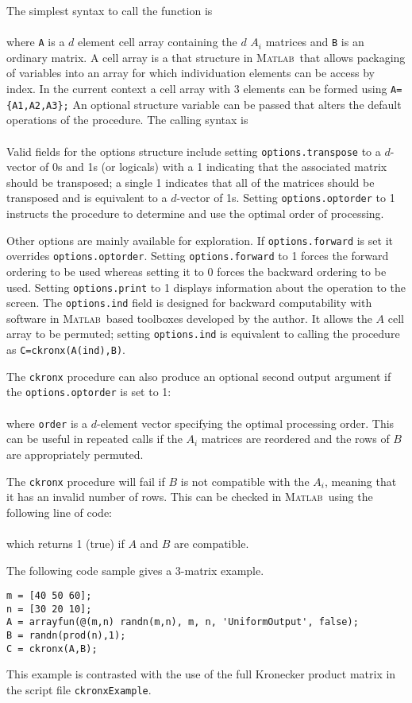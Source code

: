\documentclass[12pt,fleqn]{article}
\def\matlab{\textsc{Matlab}}   %
\begin{document}
The simplest syntax to call the function is\\
\hspace*{1in}{\tt C=ckronx(A,B)}\\
where {\tt A} is a $d$ element cell array containing the $d$ $A_i$ matrices and {\tt B} is an ordinary matrix. A cell array is a that structure in \matlab~that allows packaging of variables into an array for which individuation elements can be access by index. In the current context a cell array with 3 elements can be formed using {\tt A=\{A1,A2,A3\};} An optional structure variable can be passed that alters the default operations of the procedure. The calling syntax is\\
\hspace*{1in}{\tt C=ckronx(A,B,options)}\\
Valid fields for the options structure include setting {\tt options.transpose} to a $d$-vector of 0s and 1s (or logicals) with a 1 indicating that the associated matrix should be transposed; a single 1 indicates that all of the matrices should be transposed and is equivalent to a $d$-vector of 1s. Setting {\tt options.optorder} to 1 instructs the procedure to determine and use the optimal order of processing.

Other options are mainly available for exploration. If {\tt options.forward} is set it overrides {\tt options.optorder}. Setting {\tt options.forward} to 1 forces the forward ordering to be used whereas setting it to 0 forces the backward ordering to be used. Setting {\tt options.print} to 1 displays information about the operation to the screen. The {\tt options.ind} field is designed for backward computability with software in \matlab~based toolboxes developed by the author. It allows the $A$ cell array to be permuted; setting {\tt options.ind} is equivalent to calling the procedure as {\tt C=ckronx(A(ind),B)}.

The {\tt ckronx} procedure can also produce an optional second output argument if the {\tt options.optorder} is set to 1:\\
\hspace*{1in}{\tt[C,order]=ckronx(A,B,options)}\\
where {\tt order} is a $d$-element vector specifying the optimal processing order. This can be useful in repeated calls if the $A_i$ matrices are reordered and the rows of $B$ are appropriately permuted.

The {\tt ckronx} procedure will fail if $B$ is not compatible with the $A_i$, meaning that it has an invalid number of rows. This can be checked in \matlab~using the following line of code:\\
\hspace*{0.5in}{\tt size(B,1) == prod( cellfun( @(x) size(x,2), A ) )}\\
which returns 1 (true) if $A$ and $B$ are compatible.

The following code sample gives a 3-matrix example.
\begin{verbatim}
m = [40 50 60];
n = [30 20 10];
A = arrayfun(@(m,n) randn(m,n), m, n, 'UniformOutput', false);
B = randn(prod(n),1);
C = ckronx(A,B);
\end{verbatim}
\noindent This example is contrasted with the use of the full Kronecker product matrix in the script file {\tt ckronxExample}.
\end{document}
